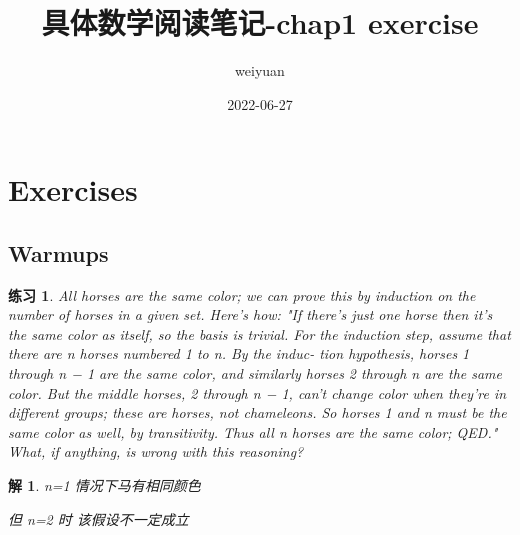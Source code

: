 \documentclass[mode=geye]{elegantnote}
\title{具体数学阅读笔记-chap1 exercise}
\author{weiyuan}
\date{2022-06-27}
\newtheorem{exercise}{练习}
\newtheorem{answer}{解}
\begin{document}
	\maketitle
	
	\section{Exercises}
	\subsection{Warmups}
	
	\begin{exercise}
		All horses are the same color; we can prove this by induction on the
		number of horses in a given set. Here's how: "If there's just one horse
		then it's the same color as itself, so the basis is trivial. For the induction
		step, assume that there are n horses numbered 1 to n. By the induc-
		tion hypothesis, horses 1 through n − 1 are the same color, and similarly
		horses 2 through n are the same color. But the middle horses, 2 through
		n − 1, can't change color when they're in different groups; these are
		horses, not chameleons. So horses 1 and n must be the same color as
		well, by transitivity. Thus all n horses are the same color; QED." What,
		if anything, is wrong with this reasoning?
	\end{exercise}
	\begin{answer}
		n=1 情况下马有相同颜色
		
		但 n=2 时	该假设不一定成立
	\end{answer}
	
\end{document}
